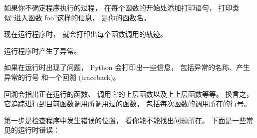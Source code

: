 
如果你不确定程序执行的过程， 在每个函数的开始处添加打印语句， 打印类似``进入函数 foo''这样的信息，  是你的函数名。


现在运行程序时， 就会打印出每个函数调用的轨迹。


运行程序时产生了异常。



如果在运行时出现了问题， Python 会打印出一些信息， 包括异常的名称、产生异常的行号
和一个回溯 (traceback)。


回溯会指出正在运行的函数、 调用它的上层函数以及上上层函数等等。
换言之， 它追踪进行到目前函数调用所调用过的函数， 包括每次函数的调用所在的行号。


第一步是检查程序中发生错误的位置， 看你能不能找出问题所在。
下面是一些常见的运行时错误：

